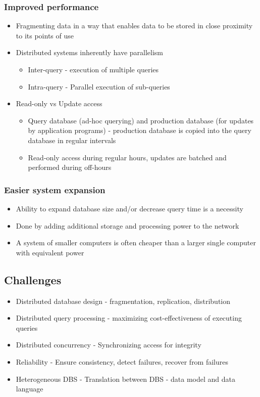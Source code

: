 \documentclass[10pt,a4paper]{article}
\begin{document}
	\subsubsection{Improved performance}
	\begin{itemize}
		\item Fragmenting data in a way that enables data to be stored in close proximity to its points of use
		\item Distributed systems inherently have parallelism
		\begin{itemize}
			\item Inter-query - execution of multiple queries
			\item Intra-query - Parallel execution of sub-queries
		\end{itemize}
		\item Read-only vs Update access
		\begin{itemize}
			\item Query database (ad-hoc querying) and production database (for updates by application programs) - production database is copied into the query database in regular intervals
			\item Read-only access during regular hours, updates are batched and performed during off-hours
		\end{itemize}
	\end{itemize}
	
	\subsubsection{Easier system expansion}
	\begin{itemize}
		\item Ability to expand database size and/or decrease query time is a necessity
		\item Done by adding additional storage and processing power to the network
		\item A system of smaller computers is often cheaper than a larger single computer with equivalent power
	\end{itemize}

\subsection{Challenges}
	\begin{itemize}
		\item Distributed database design - fragmentation, replication, distribution
		\item Distributed query processing - maximizing cost-effectiveness of executing queries
		\item Distributed concurrency - Synchronizing access for integrity
		\item Reliability - Ensure consistency, detect failures, recover from failures
		\item Heterogeneous DBS - Translation between DBS - data model and data language
	\end{itemize}
\end{document}
